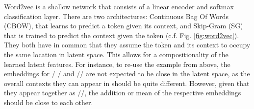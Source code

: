 \documentclass[8pt]{article}
\begin{document}
Word2vec is a shallow network that consists of a linear encoder and softmax classification layer. There are two architectures: Continuous Bag Of Words (CBOW), that learns to predict a token given its context, and Skip-Gram (SG) that is trained to predict the context given the token (c.f. Fig. \ref{fig:word2vec}). They both have in common that they assume the token and its context to occupy the same location in latent space. This allows for a compositionality of the learned latent features. For instance, to re-use the example from above, the embeddings for / / and // are not expected to be close in the latent space, as the overall contexts they can appear in should be quite different. However, given that they appear together as //, the addition or mean of the respective embeddings should be close to each other.
\end{document}
